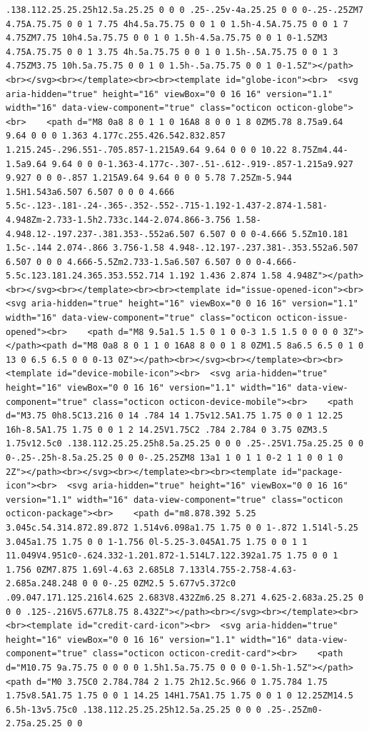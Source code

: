 \documentclass[
  letterpaper,
]{book}
\begin{document}
\begin{verbatim}
.138.112.25.25.25h12.5a.25.25 0 0 0 .25-.25v-4a.25.25 0 0 0-.25-.25ZM7 4.75A.75.75 0 0 1 7.75 4h4.5a.75.75 0 0 1 0 1.5h-4.5A.75.75 0 0 1 7 4.75ZM7.75 10h4.5a.75.75 0 0 1 0 1.5h-4.5a.75.75 0 0 1 0-1.5ZM3 4.75A.75.75 0 0 1 3.75 4h.5a.75.75 0 0 1 0 1.5h-.5A.75.75 0 0 1 3 4.75ZM3.75 10h.5a.75.75 0 0 1 0 1.5h-.5a.75.75 0 0 1 0-1.5Z"></path><br></svg><br></template><br><br><template id="globe-icon"><br>  <svg aria-hidden="true" height="16" viewBox="0 0 16 16" version="1.1" width="16" data-view-component="true" class="octicon octicon-globe"><br>    <path d="M8 0a8 8 0 1 1 0 16A8 8 0 0 1 8 0ZM5.78 8.75a9.64 9.64 0 0 0 1.363 4.177c.255.426.542.832.857 1.215.245-.296.551-.705.857-1.215A9.64 9.64 0 0 0 10.22 8.75Zm4.44-1.5a9.64 9.64 0 0 0-1.363-4.177c-.307-.51-.612-.919-.857-1.215a9.927 9.927 0 0 0-.857 1.215A9.64 9.64 0 0 0 5.78 7.25Zm-5.944 1.5H1.543a6.507 6.507 0 0 0 4.666 5.5c-.123-.181-.24-.365-.352-.552-.715-1.192-1.437-2.874-1.581-4.948Zm-2.733-1.5h2.733c.144-2.074.866-3.756 1.58-4.948.12-.197.237-.381.353-.552a6.507 6.507 0 0 0-4.666 5.5Zm10.181 1.5c-.144 2.074-.866 3.756-1.58 4.948-.12.197-.237.381-.353.552a6.507 6.507 0 0 0 4.666-5.5Zm2.733-1.5a6.507 6.507 0 0 0-4.666-5.5c.123.181.24.365.353.552.714 1.192 1.436 2.874 1.58 4.948Z"></path><br></svg><br></template><br><br><template id="issue-opened-icon"><br>  <svg aria-hidden="true" height="16" viewBox="0 0 16 16" version="1.1" width="16" data-view-component="true" class="octicon octicon-issue-opened"><br>    <path d="M8 9.5a1.5 1.5 0 1 0 0-3 1.5 1.5 0 0 0 0 3Z"></path><path d="M8 0a8 8 0 1 1 0 16A8 8 0 0 1 8 0ZM1.5 8a6.5 6.5 0 1 0 13 0 6.5 6.5 0 0 0-13 0Z"></path><br></svg><br></template><br><br><template id="device-mobile-icon"><br>  <svg aria-hidden="true" height="16" viewBox="0 0 16 16" version="1.1" width="16" data-view-component="true" class="octicon octicon-device-mobile"><br>    <path d="M3.75 0h8.5C13.216 0 14 .784 14 1.75v12.5A1.75 1.75 0 0 1 12.25 16h-8.5A1.75 1.75 0 0 1 2 14.25V1.75C2 .784 2.784 0 3.75 0ZM3.5 1.75v12.5c0 .138.112.25.25.25h8.5a.25.25 0 0 0 .25-.25V1.75a.25.25 0 0 0-.25-.25h-8.5a.25.25 0 0 0-.25.25ZM8 13a1 1 0 1 1 0-2 1 1 0 0 1 0 2Z"></path><br></svg><br></template><br><br><template id="package-icon"><br>  <svg aria-hidden="true" height="16" viewBox="0 0 16 16" version="1.1" width="16" data-view-component="true" class="octicon octicon-package"><br>    <path d="m8.878.392 5.25 3.045c.54.314.872.89.872 1.514v6.098a1.75 1.75 0 0 1-.872 1.514l-5.25 3.045a1.75 1.75 0 0 1-1.756 0l-5.25-3.045A1.75 1.75 0 0 1 1 11.049V4.951c0-.624.332-1.201.872-1.514L7.122.392a1.75 1.75 0 0 1 1.756 0ZM7.875 1.69l-4.63 2.685L8 7.133l4.755-2.758-4.63-2.685a.248.248 0 0 0-.25 0ZM2.5 5.677v5.372c0 .09.047.171.125.216l4.625 2.683V8.432Zm6.25 8.271 4.625-2.683a.25.25 0 0 0 .125-.216V5.677L8.75 8.432Z"></path><br></svg><br></template><br><br><template id="credit-card-icon"><br>  <svg aria-hidden="true" height="16" viewBox="0 0 16 16" version="1.1" width="16" data-view-component="true" class="octicon octicon-credit-card"><br>    <path d="M10.75 9a.75.75 0 0 0 0 1.5h1.5a.75.75 0 0 0 0-1.5h-1.5Z"></path><path d="M0 3.75C0 2.784.784 2 1.75 2h12.5c.966 0 1.75.784 1.75 1.75v8.5A1.75 1.75 0 0 1 14.25 14H1.75A1.75 1.75 0 0 1 0 12.25ZM14.5 6.5h-13v5.75c0 .138.112.25.25.25h12.5a.25.25 0 0 0 .25-.25Zm0-2.75a.25.25 0 0 
\end{verbatim}
\end{document}
